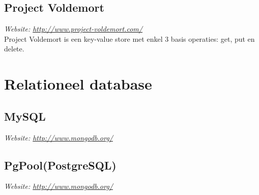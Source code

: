 \subsection{Project Voldemort}
\textit{Website: \url{http://www.project-voldemort.com/}}\\
Project Voldemort is een key-value store met enkel 3 basis operaties: get, put en delete. 
\section{Relationeel database}

\subsection{MySQL}
\textit{Website: \url{http://www.mongodb.org/}}\\

\subsection{PgPool(PostgreSQL)}
\textit{Website: \url{http://www.mongodb.org/}}\\